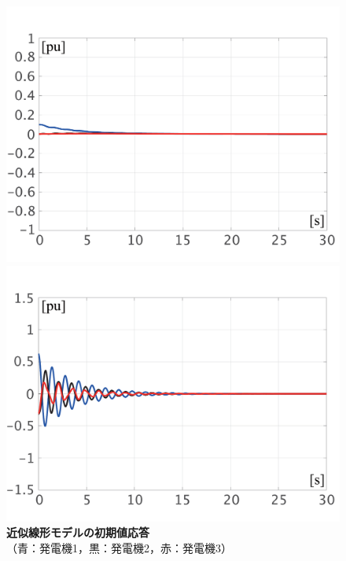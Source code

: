 \documentclass[tombow,dvipdfmx]{corona-a5-1.1}
\begin{document}
\begin{figure}[t]
{\begin{minipage}{0.49\linewidth}
    \includegraphics[width = 1.0\linewidth]{figs/Elin}
    \medskip
  \end{minipage}
  \begin{minipage}{0.49\linewidth}
    \centering
    \includegraphics[width = 1.0\linewidth]{figs/Plin}
    \medskip
  \end{minipage}
  }
  \medskip
  \caption{\textbf{近似線形モデルの初期値応答}
  \\  \centering（青：発電機1，黒：発電機2，赤：発電機3）}
  \label{fig:timeex}
\medskip
\end{figure}


\end{document}
